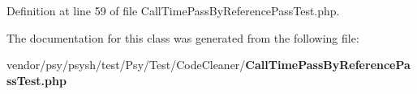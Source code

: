 Definition at line 59 of file Call\+Time\+Pass\+By\+Reference\+Pass\+Test.\+php.



The documentation for this class was generated from the following file\+:\begin{DoxyCompactItemize}
\item 
vendor/psy/psysh/test/\+Psy/\+Test/\+Code\+Cleaner/{\bf Call\+Time\+Pass\+By\+Reference\+Pass\+Test.\+php}\end{DoxyCompactItemize}

